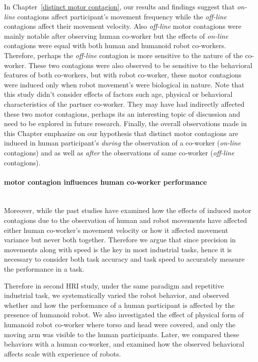 In Chapter~\ref{distinct motor contagion}, our results and findings suggest that \textit{on-line} contagions affect participant's movement frequency while the \textit{off-line} contagions affect their movement velocity. Also \textit{off-line} motor contagions were mainly notable after observing human co-worker but the effects of \textit{on-line} contagions were equal with both human and humanoid robot co-workers. Therefore, perhaps the \textit{off-line} contagion is more sensitive to the nature of the co-worker. These two contagions were also observed to be sensitive to the behavioral features of both co-workers, but with robot co-worker, these motor contagions were induced only when robot movement's were biological in nature. Note that this study didn't consider effects of factors such age, physical or behavioral characteristics of the partner co-worker. They may have had indirectly affected these two motor contagions, perhaps its an interesting topic of discussion and need to be explored in future research. Finally, the overall observations made in this Chapter emphasize on our hypothesis that distinct motor contagions are induced in human participant's \emph{during} the observation of a co-worker (\textit{on-line} contagions) and as well as \emph{after} the observations of same co-worker (\textit{off-line} contagions).




\paragraph*{\LARGE {motor contagion influences human co-worker performance \\}\\}



Moreover, while the past studies have examined how the effects of induced motor contagions due to the observation of human and robot movements have affected either human co-worker's movement velocity or how it affected movement variance but never both together. Therefore we argue that since precision in movements along with speed is the key in most industrial tasks, hence it is necessary to consider both task accuracy and task speed to accurately measure the performance in a task.

Therefore in second HRI study, under the same paradigm and repetitive industrial task, we systematically varied the robot behavior, and observed whether and how the performance of a human participant is affected by the presence of humanoid robot. We also investigated the effect of physical form of humanoid robot co-worker where torso and head were covered, and only the moving arm was visible to the human participants. Later, we compared these behaviors with a human co-worker, and examined how the observed behavioral affects scale with experience of robots. 

